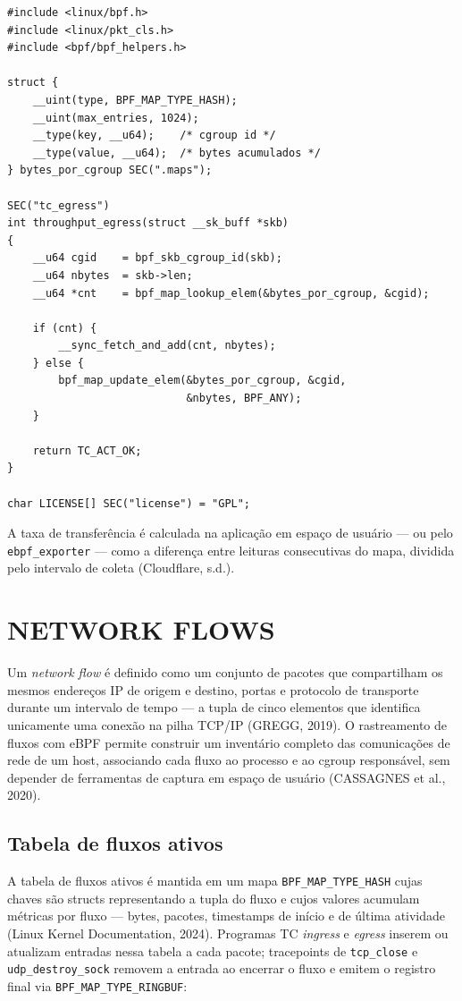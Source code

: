 \begin{lstlisting}[caption={Throughput por cgroup no TC egress.}, label=lst:obs-throughput-cgroup]
#include <linux/bpf.h>
#include <linux/pkt_cls.h>
#include <bpf/bpf_helpers.h>

struct {
    __uint(type, BPF_MAP_TYPE_HASH);
    __uint(max_entries, 1024);
    __type(key, __u64);    /* cgroup id */
    __type(value, __u64);  /* bytes acumulados */
} bytes_por_cgroup SEC(".maps");

SEC("tc_egress")
int throughput_egress(struct __sk_buff *skb)
{
    __u64 cgid    = bpf_skb_cgroup_id(skb);
    __u64 nbytes  = skb->len;
    __u64 *cnt    = bpf_map_lookup_elem(&bytes_por_cgroup, &cgid);

    if (cnt) {
        __sync_fetch_and_add(cnt, nbytes);
    } else {
        bpf_map_update_elem(&bytes_por_cgroup, &cgid,
                            &nbytes, BPF_ANY);
    }

    return TC_ACT_OK;
}

char LICENSE[] SEC("license") = "GPL";
\end{lstlisting}

A taxa de transferência é calculada na aplicação em espaço de usuário — ou pelo
\texttt{ebpf\_exporter} — como a diferença entre leituras consecutivas do mapa,
dividida pelo intervalo de coleta (Cloudflare, s.d.).

\section{NETWORK FLOWS}

Um \textit{network flow} é definido como um conjunto de pacotes que compartilham
os mesmos endereços IP de origem e destino, portas e protocolo de transporte durante
um intervalo de tempo — a tupla de cinco elementos que identifica unicamente uma
conexão na pilha TCP/IP (GREGG, 2019). O rastreamento de fluxos com eBPF permite
construir um inventário completo das comunicações de rede de um host, associando cada
fluxo ao processo e ao cgroup responsável, sem depender de ferramentas de captura em
espaço de usuário (CASSAGNES et al., 2020).

\subsection*{Tabela de fluxos ativos}

A tabela de fluxos ativos é mantida em um mapa \texttt{BPF\_MAP\_TYPE\_HASH}
cujas chaves são structs representando a tupla do fluxo e cujos valores acumulam
métricas por fluxo — bytes, pacotes, timestamps de início e de última atividade (Linux
Kernel Documentation, 2024). Programas TC \textit{ingress} e \textit{egress} inserem
ou atualizam entradas nessa tabela a cada pacote; tracepoints de \texttt{tcp\_close} e
\texttt{udp\_destroy\_sock} removem a entrada ao encerrar o fluxo e emitem o registro
final via \texttt{BPF\_MAP\_TYPE\_RINGBUF}:

